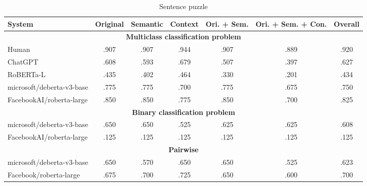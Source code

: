 \begin{table*}
	\caption{Sentence puzzle}
	\label{tab:sentence-results-table}
	\begin{center}
		\begin{tabular}{lcccccc}
			\toprule
			\textbf{System}           & \textbf{Original} & \textbf{Semantic} & \textbf{Context} & \textbf{Ori. + Sem.} & \textbf{Ori. + Sem. + Con.} & \textbf{Overall} \\
			\midrule
			\multicolumn{7}{c}{\textbf{Multiclass classification problem}}                                                                                              \\
			\midrule
			\color{gray}Human         & \color{gray}.907  & \color{gray}.907  & \color{gray}.944 & \color{gray}.907     & \color{gray}.889            & \color{gray}.920 \\
			\color{gray}ChatGPT       & \color{gray}.608  & \color{gray}.593  & \color{gray}.679 & \color{gray}.507     & \color{gray}.397            & \color{gray}.627 \\
			\color{gray}RoBERTa-L     & \color{gray}.435  & \color{gray}.402  & \color{gray}.464 & \color{gray}.330     & \color{gray}.201            & \color{gray}.434 \\
			\midrule
			microsoft/deberta-v3-base & .775              & .775              & .700             & .775                 & .675                        & .750             \\
			FacebookAI/roberta-large  & .850              & .850              & .775             & .850                 & .700                        & .825             \\
			\midrule
			\multicolumn{7}{c}{\textbf{Binary classification problem}}                                                                                                   \\
			microsoft/deberta-v3-base & .650              & .650              & .525             & .625                 & .625                        & .608             \\
			FacebookAI/roberta-large  & .125              & .125              & .125             & .125                 & .125                        & .125             \\
			\midrule
			\multicolumn{7}{c}{\textbf{Pairwise}}                                                                                                                        \\
			\midrule
			microsoft/deberta-v3-base & .650              & .570              & .650             & .650                 & .525                        & .623             \\
			Facebook/roberta-large    & .675              & .700              & .725             & .650                 & .600                        & .700             \\
			\bottomrule
		\end{tabular}
	\end{center}
\end{table*}

